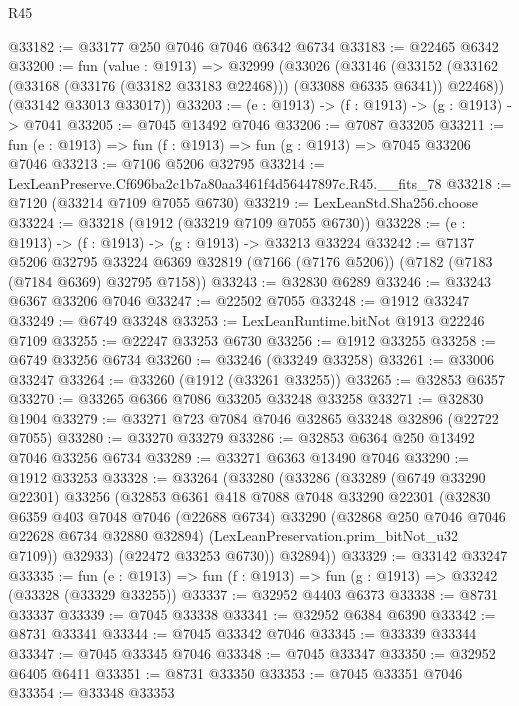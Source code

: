 \begin{lexlean}{R45}
\begin{coremodule}
{@33182 := @33177 @250 @7046 @7046 @6342 @6734
@33183 := @22465 @6342
@33200 := fun (value : @1913) =>
  @32999
    (@33026
      (@33146
        (@33152 (@33162 (@33168 (@33176 (@33182 @33183 @22468))) (@33088 @6335 @6341)) @22468))
      (@33142 @33013 @33017))
@33203 := (e : @1913) -> (f : @1913) -> (g : @1913) -> @7041
@33205 := @7045 @13492 @7046
@33206 := @7087 @33205
@33211 := fun (e : @1913) => fun (f : @1913) => fun (g : @1913) => @7045 @33206 @7046
@33213 := @7106 @5206 @32795
@33214 := LexLeanPreserve.Cf696ba2c1b7a80aa3461f4d56447897c.R45.__fits_78
@33218 := @7120 (@33214 @7109 @7055 @6730)
@33219 := LexLeanStd.Sha256.choose
@33224 := @33218 (@1912 (@33219 @7109 @7055 @6730))
@33228 := (e : @1913) -> (f : @1913) -> (g : @1913) -> @33213 @33224
@33242 := @7137
    @5206
    @32795
    @33224
    @6369
    @32819
    (@7166 (@7176 @5206))
    (@7182 (@7183 (@7184 @6369) @32795 @7158))
@33243 := @32830 @6289
@33246 := @33243 @6367 @33206 @7046
@33247 := @22502 @7055
@33248 := @1912 @33247
@33249 := @6749 @33248
@33253 := LexLeanRuntime.bitNot @1913 @22246 @7109
@33255 := @22247 @33253 @6730
@33256 := @1912 @33255
@33258 := @6749 @33256 @6734
@33260 := @33246 (@33249 @33258)
@33261 := @33006 @33247
@33264 := @33260 (@1912 (@33261 @33255))
@33265 := @32853 @6357
@33270 := @33265 @6366 @7086 @33205 @33248 @33258
@33271 := @32830 @1904
@33279 := @33271 @723 @7084 @7046 @32865 @33248 @32896 (@22722 @7055)
@33280 := @33270 @33279
@33286 := @32853 @6364 @250 @13492 @7046 @33256 @6734
@33289 := @33271 @6363 @13490 @7046
@33290 := @1912 @33253
@33328 := @33264
    (@33280
      (@33286
        (@33289
          (@6749 @33290 @22301)
          @33256
          (@32853
            @6361
            @418
            @7088
            @7048
            @33290
            @22301
            (@32830
              @6359
              @403
              @7048
              @7046
              (@22688 @6734)
              @33290
              (@32868 @250 @7046 @7046 @22628 @6734 @32880 @32894)
              (LexLeanPreservation.prim_bitNot_u32 @7109))
            @32933)
          (@22472 @33253 @6730))
        @32894))
@33329 := @33142 @33247
@33335 := fun (e : @1913) => fun (f : @1913) => fun (g : @1913) => @33242 (@33328 (@33329 @33255))
@33337 := @32952 @4403 @6373
@33338 := @8731 @33337
@33339 := @7045 @33338
@33341 := @32952 @6384 @6390
@33342 := @8731 @33341
@33344 := @7045 @33342 @7046
@33345 := @33339 @33344
@33347 := @7045 @33345 @7046
@33348 := @7045 @33347
@33350 := @32952 @6405 @6411
@33351 := @8731 @33350
@33353 := @7045 @33351 @7046
@33354 := @33348 @33353
}
\end{coremodule}
\end{lexlean}
